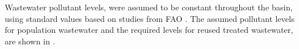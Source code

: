 
Wastewater pollutant levels, were assumed to be constant throughout the basin, using standard values based on studies from FAO \cite{fao1985water}. The assumed pollutant levels for population wastewater and the required levels for reused treated wastewater, are shown in .


